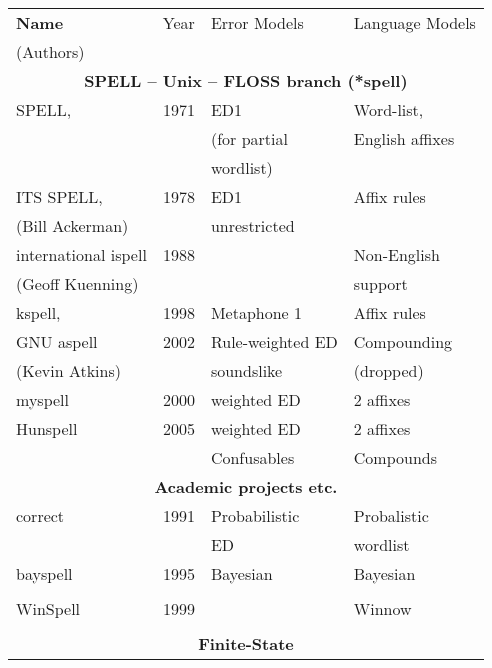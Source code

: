 \documentclass[officiallayout,final]{unihelcompling}
\begin{document}
\begin{longtable}{|l|r|l|l|}
        \hline
        \bf Name & Year & Error Models & Language Models \\
(Authors)        &      &              & \\
        \hline
        \multicolumn{4}{|c|}{\bf SPELL -- Unix -- FLOSS branch (*spell) }\\
        \hline
             SPELL,            & 1971 & ED1          & Word-list,    \\
        \citep{gorin1971spell} &      & (for partial & English affixes \\
                               &      &  wordlist)  &              \\
        ITS SPELL,             & 1978 & ED1          & Affix rules \\
     (Bill Ackerman)           &      & unrestricted &  \\
        international ispell   & 1988 &              & Non-English \\
              (Geoff Kuenning) &      &              & support \\
        \hline
        kspell,                & 1998 & Metaphone 1 & Affix rules \\
        GNU aspell             & 2002 & Rule-weighted ED & Compounding \\
    (Kevin Atkins)             &      & soundslike & (dropped)  \\
        \hline
        myspell & 2000 & weighted ED & 2 affixes \\
        \hline
        Hunspell & 2005 & weighted ED & 2 affixes  \\
                 &      & Confusables & Compounds  \\
        \hline
        \multicolumn{4}{|c|}{\bf Academic projects etc.} \\
        \hline
        correct & 1991 & Probabilistic & Probalistic \\
        \citep{church1991probability} & & ED & wordlist \\
        \hline
        bayspell  & 1995 & Bayesian & Bayesian \\
        \citep{golding1995bayesian} & & & \\
        \hline
        WinSpell & 1999 & & Winnow \\
        \citep{golding1999winnow} & & & \\
        \hline
        \multicolumn{4}{|c|}{\bf Finite-State} \\

\end{longtable}
\end{document}
